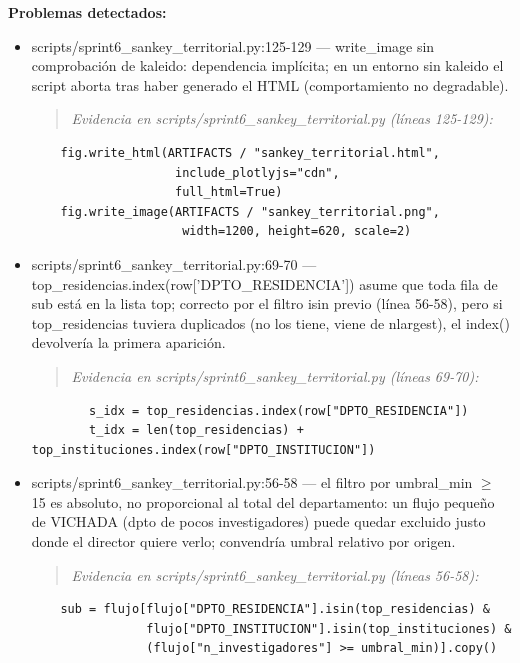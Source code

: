 \begin{tcolorbox}[riesgo]
\textbf{Problemas detectados:}
\begin{itemize}
  \item scripts/sprint6\_sankey\_territorial.py:125-129 --- write\_image sin comprobación de kaleido: dependencia implícita; en un entorno sin kaleido el script aborta tras haber generado el HTML (comportamiento no degradable).
\begin{quote}\footnotesize\ttfamily
\noindent\emph{Evidencia en scripts/sprint6\_sankey\_territorial.py (líneas 125-129):}
\end{quote}
\begin{lstlisting}
    fig.write_html(ARTIFACTS / "sankey_territorial.html",
                    include_plotlyjs="cdn",
                    full_html=True)
    fig.write_image(ARTIFACTS / "sankey_territorial.png",
                     width=1200, height=620, scale=2)
\end{lstlisting}

  \item scripts/sprint6\_sankey\_territorial.py:69-70 --- top\_residencias.index(row['DPTO\_RESIDENCIA']) asume que toda fila de sub está en la lista top; correcto por el filtro isin previo (línea 56-58), pero si top\_residencias tuviera duplicados (no los tiene, viene de nlargest), el index() devolvería la primera aparición.
\begin{quote}\footnotesize\ttfamily
\noindent\emph{Evidencia en scripts/sprint6\_sankey\_territorial.py (líneas 69-70):}
\end{quote}
\begin{lstlisting}
        s_idx = top_residencias.index(row["DPTO_RESIDENCIA"])
        t_idx = len(top_residencias) + top_instituciones.index(row["DPTO_INSTITUCION"])
\end{lstlisting}

  \item scripts/sprint6\_sankey\_territorial.py:56-58 --- el filtro por umbral\_min $\geq$ 15 es absoluto, no proporcional al total del departamento: un flujo pequeño de VICHADA (dpto de pocos investigadores) puede quedar excluido justo donde el director quiere verlo; convendría umbral relativo por origen.
\begin{quote}\footnotesize\ttfamily
\noindent\emph{Evidencia en scripts/sprint6\_sankey\_territorial.py (líneas 56-58):}
\end{quote}
\begin{lstlisting}
    sub = flujo[flujo["DPTO_RESIDENCIA"].isin(top_residencias) &
                flujo["DPTO_INSTITUCION"].isin(top_instituciones) &
                (flujo["n_investigadores"] >= umbral_min)].copy()
\end{lstlisting}

\end{itemize}
\end{tcolorbox}

